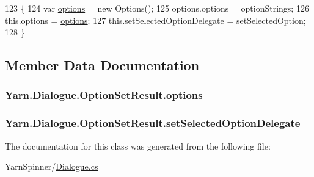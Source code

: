 \begin{DoxyCode}
123                                                                                                   \{
124                 var \hyperlink{a00060_abda9c3047ff9d3c3ec5540566a239315}{options} = \textcolor{keyword}{new} Options();
125                 options.options = optionStrings;
126                 this.options = \hyperlink{a00060_abda9c3047ff9d3c3ec5540566a239315}{options};
127                 this.setSelectedOptionDelegate = setSelectedOption;
128             \}
\end{DoxyCode}


\subsection{Member Data Documentation}
\hypertarget{a00060_abda9c3047ff9d3c3ec5540566a239315}{
\subsubsection[{options}]{ Yarn.\-Dialogue.\-Option\-Set\-Result.\-options}}\label{a00060_abda9c3047ff9d3c3ec5540566a239315}
\hypertarget{a00060_a6f2683598cf0f62b76bb864640cc79dd}{
\subsubsection[{set\-Selected\-Option\-Delegate}]{ Yarn.\-Dialogue.\-Option\-Set\-Result.\-set\-Selected\-Option\-Delegate}}\label{a00060_a6f2683598cf0f62b76bb864640cc79dd}


The documentation for this class was generated from the following file\-:\begin{DoxyCompactItemize}
\item 
Yarn\-Spinner/\hyperlink{a00117}{Dialogue.\-cs}\end{DoxyCompactItemize}
